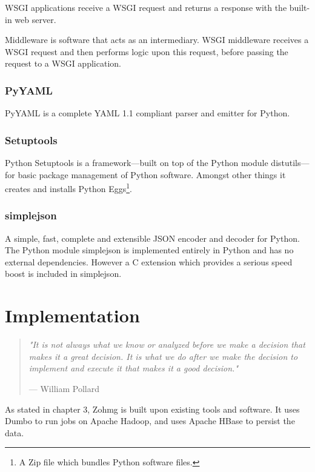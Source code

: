 \documentclass[a4paper,10pt]{book}
\newcommand{\chapterquote}[2] {
\begin{quote}
\textit{"{#1}"}

--- {#2}
\end{quote}

\vspace{24pt}
}
\begin{document}
WSGI applications receive a WSGI request and returns a response with the
built-in web server.

Middleware is software that acts as an intermediary. WSGI middleware
receives a WSGI request and then performs logic upon this request, before
passing the request to a WSGI application. \cite{paste}


\subsection{PyYAML}

PyYAML is a complete YAML 1.1 compliant parser and emitter for Python.
\cite{pyyaml}


\subsection{Setuptools}

Python Setuptools is a framework---built on top of the Python module
distutils---for basic package management of Python software. Amongst other
things it creates and installs Python Eggs\footnote{A Zip file which
bundles Python software files.}. \cite{setuptools}


\subsection{simplejson}

A simple, fast, complete and extensible JSON encoder and decoder for
Python. The Python module simplejson is implemented entirely in Python and
has no external dependencies. However a C extension which provides a
serious speed boost is included in simplejson. \cite{simplejson}




\chapter{Implementation}


\chapterquote{It is not always what we know or analyzed before we make a
decision that makes it a great decision. It is what we do after we make the
decision to implement and execute it that makes it a good
decision.}{William Pollard}

As stated in chapter 3, Zohmg is built upon existing tools and software. It
uses Dumbo to run jobs on Apache Hadoop, and uses Apache HBase to persist the
data.
\end{document}
